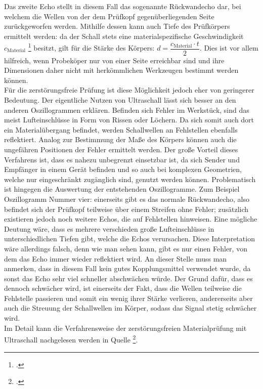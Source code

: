 \documentclass[reducespace,stylepage,semiarbeit]{spezidoc}
\begin{document}
Das zweite Echo stellt in diesem Fall das sogenannte Rückwandecho dar, bei welchem die Wellen von der dem Prüfkopf gegenüberliegenden Seite zurückgeworfen werden. 
Mithilfe dessen kann auch Tiefe des Prüfkörpers ermittelt werden: da der Schall stets eine materialspezifische Geschwindigkeit $c_\mathrm{Material}$  \footcite{schallgeschwindigkeiten}
besitzt, gilt für die Stärke des Körpers: $d = \dfrac{c_{\mathrm{Material}} \cdot t}{2}$. 
Dies ist vor allem hilfreich, wenn Probeköper nur von einer Seite erreichbar sind und ihre Dimensionen daher nicht mit herkömmlichen Werkzeugen bestimmt werden können.\\
Für die zerstörungsfreie Prüfung ist diese Möglichkeit jedoch eher von geringerer Bedeutung. 
Der eigentliche Nutzen von Ultraschall lässt sich besser an den anderen Oszillogrammen erklären. 
Befinden sich Fehler im Werkstück, sind das meist Lufteinschlüsse in Form von Rissen oder Löchern. 
Da sich somit auch dort ein Materialübergang befindet, werden Schallwellen an Fehlstellen ebenfalls reflektiert. 
Analog zur Bestimmung der Maße des Körpers können auch die ungefähren Positionen der Fehler ermittelt werden. 
Der große Vorteil dieses Verfahrens ist, dass es nahezu unbegrenzt einsetzbar ist, da sich Sender und Empfänger in einem Gerät befinden und so auch bei komplexen Geometrien, welche nur eingeschränkt zugänglich sind, genutzt werden können. 
Problematisch ist hingegen die Auswertung der entstehenden Oszillogramme. 
Zum Beispiel Oszillogramm Nummer vier: einerseits gibt es das normale Rückwandecho, also befindet sich der Prüfkopf teilweise über einem Streifen ohne Fehler; zusätzlich existieren jedoch noch weitere Echos, die auf Fehlstellen hinweisen. 
Eine mögliche Deutung wäre, dass es mehrere verschieden große Lufteinschlüsse in unterschiedlichen Tiefen gibt, welche die Echos verursachen. 
Diese Interpretation wäre allerdings falsch, denn wie man sehen kann, gibt es nur einen Fehler, von dem das Echo immer wieder reflektiert wird. 
An dieser Stelle muss man anmerken, dass in diesem Fall kein gutes Kopplungsmittel verwendet wurde, da sonst das Echo sehr viel schneller abschwächen würde. 
Der Grund dafür, dass es dennoch schwächer wird, ist einerseits der Fakt, dass die Wellen teilweise die Fehlstelle passieren und somit ein wenig ihrer Stärke verlieren, andererseits aber auch die Streuung der Schallwellen im Körper, sodass das Signal stetig schwächer wird.\\
Im Detail kann die Verfahrensweise der zerstörungsfreien Materialprüfung mit Ultraschall nachgelesen werden in Quelle 
\footcite{karldeutsch}. 
\end{document}
